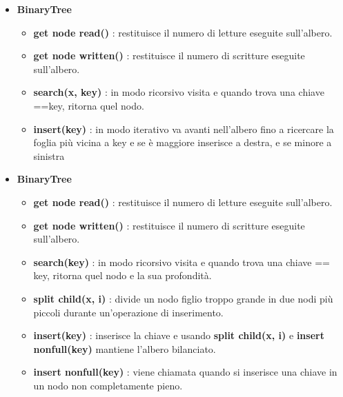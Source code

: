 \begin{itemize}

    \item \textbf{BinaryTree}
    \begin{itemize}

        \item \textbf{get node read()} : restituisce il numero di letture eseguite sull'albero.

        \item \textbf{get node written()} : restituisce il numero di scritture eseguite sull'albero.

        \item \textbf{search(x, key)} : in modo ricorsivo visita e quando trova una chiave ==key, ritorna quel nodo.
        
        \item \textbf{insert(key)} : in modo iterativo va avanti nell'albero fino a ricercare la foglia più vicina a key e se è maggiore inserisce a destra, e se minore a sinistra
        
    \end{itemize}
    
    \item \textbf{BinaryTree}
    \begin{itemize}

        \item \textbf{get node read()} : restituisce il numero di letture eseguite sull'albero.

        \item \textbf{get node written()} : restituisce il numero di scritture eseguite sull'albero.

        \item \textbf{search(key)} : in modo ricorsivo visita e quando trova una chiave == key, ritorna quel nodo e la sua profondità.

        \item \textbf{split child(x, i)} : divide un nodo figlio troppo grande in due nodi più piccoli durante un'operazione di inserimento. 
        
        \item \textbf{insert(key)} : inserisce la  chiave e usando \textbf{split child(x, i)} e \textbf{insert nonfull(key)} mantiene l'albero bilanciato.
        
        \item \textbf{insert nonfull(key)} : viene chiamata quando si inserisce una chiave in un nodo non completamente pieno.
        

\end{itemize}
\end{itemize}
